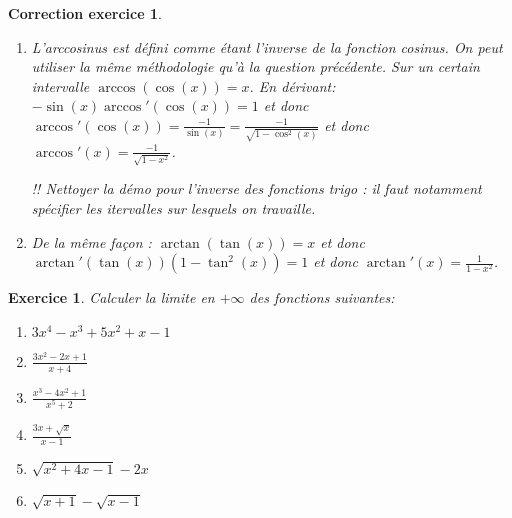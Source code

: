 \documentclass[12pt]{article}
\newtheorem{exercice}{\bf Exercice}
\newtheorem{correction}{\bf Correction exercice}
\newenvironment{exo}{
\begin{exercice}\smallskip\normalfont}{\end{exercice}
}
\newenvironment{cor}{
\begin{correction}\smallskip\normalfont}{\end{correction}
}
\begin{document}
\begin{cor}
\begin{enumerate}
  Notez que l'on peut aussi utiliser la formule de la d\'eriv\'ee de l'inverse d'une fonction:
  $(f^{-1})'(x) = \frac{1}{f'(f^{-1}(x))} = \frac{1}{\cos(\arcsin(x))}$ avec $f(x) = \sin(x)$.
  De plus, pour compl\'eter cette d\'emonstration, on peut montrer que $\cos(\arcsin(x)) = \sqrt{1 - x^2}$ :
  ces deux foncitons ont la m\^eme image en $0$ et ont pour d\'eriv\'ee ...

  !! TODO : voir comment montrer cette \'egalit\'e.

\item L'arccosinus est d\'efini comme \'etant l'inverse de la fonction cosinus.
  On peut utiliser la m\^eme m\'ethodologie qu'\`a la question pr\'ec\'edente.
  Sur un certain intervalle $\arccos(\cos(x)) = x$. En d\'erivant:
  $- \sin(x) \arccos'(\cos(x)) = 1$ et donc
  $\arccos'(\cos(x)) = \frac{-1}{\sin(x)} = \frac{-1}{\sqrt{1-\cos^2(x)}}$
  et donc $\arccos'(x) = \frac{-1}{\sqrt{1-x^2}}$.

  !! Nettoyer la d\'emo pour l'inverse des fonctions trigo :
  il faut notamment sp\'ecifier les itervalles sur lesquels on travaille.

\item De la m\^eme fa\c{c}on :
  $\arctan(\tan(x)) = x$
  et donc
  $\arctan'(\tan(x)) (1-\tan^2(x)) = 1$
  et donc $\arctan'(x) = \frac{1}{1-x^2}$.
\end{enumerate}
\end{cor}
\color{black}
\fi



\begin{exo} Calculer la limite en $+\infty$ des fonctions suivantes:
\begin{multicols}{3}
\begin{enumerate}
\item $3x^4 - x^3 + 5x^2 + x - 1$
\item $\frac{3x^2-2x+1}{x+4}$
\item $\frac{x^3-4x^2+1}{x^5+2}$
\item $\frac{3x+\sqrt{x}}{x-1}$
\item $\sqrt{x^2+4x-1} - 2x$
\item $\sqrt{x+1} - \sqrt{x-1}$
\end{enumerate}
\end{multicols}
\end{exo}
\end{document}
